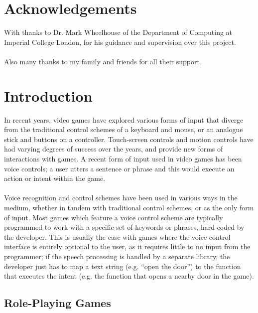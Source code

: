 \documentclass[11pt]{article}
\begin{document}
\newpage

\section{Acknowledgements}

With thanks to Dr. Mark Wheelhouse of the Department of Computing at Imperial College London, for his guidance and supervision over this project.
\\
\\
Also many thanks to my family and friends for all their support.

\newpage

\section{Introduction}
In recent years, video games have explored various forms of input that diverge from the traditional control schemes of a keyboard and mouse, or an analogue stick and buttons on a controller. Touch-screen controls and motion controls have had varying degrees of success over the years, and provide new forms of interactions with games. A recent form of input used in video games has been voice controls; a user utters a sentence or phrase and this would execute an action or intent within the game.
\\
\\
Voice recognition and control schemes have been used in various ways in the medium, whether in tandem with traditional control schemes, or as the only form of input. Most games which feature a voice control scheme are typically programmed to work with a specific set of keywords or phrases, hard-coded by the developer. This is usually the case with games where the voice control interface is entirely optional to the user, as it requires little to no input from the programmer; if the speech processing is handled by a separate library, the developer just has to map a text string (e.g. ``open the door'') to the function that executes the intent (e.g. the function that opens a nearby door in the game).

\subsection{Role-Playing Games}
\end{document}
